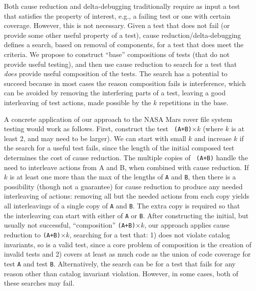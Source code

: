 Both cause reduction and delta-debugging traditionally require as
input a test that satisfies the property of interest, e.g., a failing
test or one with certain coverage.  However, this is not necessary.
Given a test that does not fail (or provide some other useful property
of a test), cause reduction/delta-debugging defines a search, based on
removal of components, for a test that does meet the criteria.  We
propose to construct ``base'' compositions of tests (that do not provide
useful testing), and then use cause reduction to search for a test that \emph{does}
provide useful composition of the tests.  The search has a potential
to succeed because in most cases the reason composition fails is
interference, which can be avoided by removing the interfering parts
of a test, leaving a good interleaving of test actions, made possible
by the $k$ repetitions in the base.

A concrete application of our approach to the NASA Mars rover file
system testing would work as follows.  First, construct the test {\tt
  (A+B)}$\times k$ (where $k$ is at least 2, and may need to be
larger).  We can start with small $k$ and increase $k$ if the search
for a useful test fails, since the length of the initial composed test
determines the cost of cause reduction.  The multiple copies of {\tt
  (A+B)} handle the need to interleave actions from A and B, when
combined with cause reduction.  If $k$ is at least one more than the
max of the lengths of {\tt A} and {\tt B}, then there is a possibility
(though not a guarantee) for cause reduction to produce any needed
interleaving of actions: removing all but the needed actions from each
copy yields all interleavings of a single copy of {\tt A} and {\tt B}.
The extra copy is required so that the interleaving can start with
either of {\tt A} or {\tt B}.  After constructing the initial, but
usually not successful, ``composition'' {\tt (A+B)}$\times k$, our
approach applies cause reduction to {\tt (A+B)}$\times k$, searching
for a test that: 1) does not violate catalog invariants, so is a valid
test, since a core problem of composition is the creation of invalid
tests and 2) covers at least as much code as the union of code
coverage for test {\tt A} and test {\tt B}.  Alternatively, the search
can be for a test that fails for any reason other than catalog
invariant violation.  However, in some cases, both of these searches
may fail.

